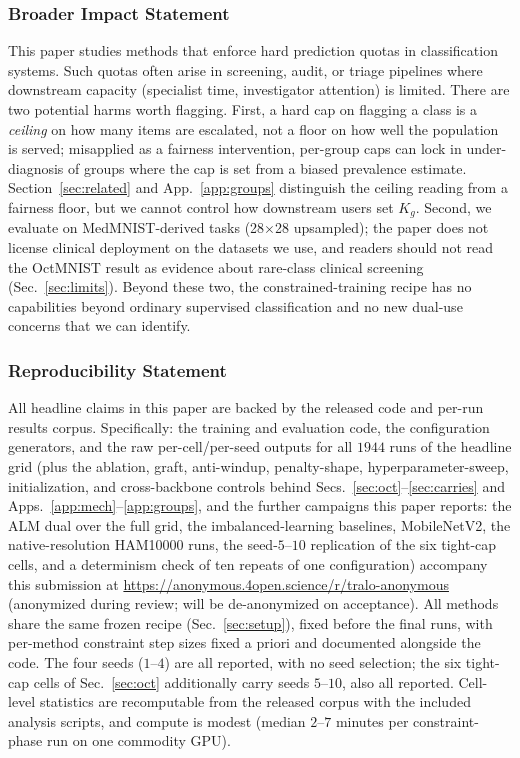 \documentclass[10pt]{article}
\begin{document}
\subsubsection*{Broader Impact Statement}
This paper studies methods that enforce hard prediction quotas in
classification systems. Such quotas often arise in screening, audit, or
triage pipelines where downstream capacity (specialist time, investigator
attention) is limited. There are two potential harms worth flagging.
First, a hard cap on flagging a class is a \emph{ceiling} on how many
items are escalated, not a floor on how well the population is served;
misapplied as a fairness intervention, per-group caps can lock in
under-diagnosis of groups where the cap is set from a biased prevalence
estimate. Section~\ref{sec:related} and App.~\ref{app:groups} distinguish
the ceiling reading from a fairness floor, but we cannot control how
downstream users set $K_g$. Second, we evaluate on MedMNIST-derived
tasks (28$\times$28 upsampled); the paper does not license clinical
deployment on the datasets we use, and readers should not read the
OctMNIST result as evidence about rare-class clinical screening
(Sec.~\ref{sec:limits}). Beyond these two, the constrained-training
recipe has no capabilities beyond ordinary supervised classification and
no new dual-use concerns that we can identify.

\subsubsection*{Reproducibility Statement}
All headline claims in this paper are backed by the released code and
per-run results corpus. Specifically: the training and evaluation code,
the configuration generators, and the raw per-cell/per-seed outputs for
all $1944$ runs of the headline grid (plus the ablation, graft,
anti-windup, penalty-shape, hyperparameter-sweep, initialization, and
cross-backbone controls behind
Secs.~\ref{sec:oct}--\ref{sec:carries} and Apps.~\ref{app:mech}--\ref{app:groups}{\color{blue},
and the further campaigns this paper reports: the ALM dual over the full grid, the
imbalanced-learning baselines, MobileNetV2, the native-resolution
HAM10000 runs, the seed-$5$--$10$ replication of the six tight-cap cells, and a
determinism check of ten repeats of one configuration})
accompany this submission at
\url{https://anonymous.4open.science/r/tralo-anonymous}
(anonymized during review; will be de-anonymized on acceptance). All
methods share the same frozen recipe (Sec.~\ref{sec:setup}), fixed before
the final runs, with per-method constraint step sizes fixed a priori and
documented alongside the code. The four seeds
($1$--$4$) are all reported, with no seed selection{\color{blue}; the six
tight-cap cells of Sec.~\ref{sec:oct} additionally carry seeds $5$--$10$, also
all reported}. Cell-level statistics are recomputable from the released
corpus with the included analysis scripts, and compute is modest
(median $2$--$7$ minutes per constraint-phase run on one commodity GPU).
\end{document}
